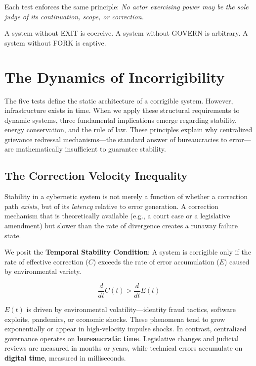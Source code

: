 \documentclass{article}
\begin{document}
Each test enforces the same principle: \textit{No actor exercising power may be the sole judge of its continuation, scope, or correction.}

A system without EXIT is coercive. A system without GOVERN is arbitrary. A system without FORK is captive.

\section{The Dynamics of Incorrigibility}

The five tests define the static architecture of a corrigible system. However, infrastructure exists in time. When we apply these structural requirements to dynamic systems, three fundamental implications emerge regarding stability, energy conservation, and the rule of law. These principles explain why centralized grievance redressal mechanisms---the standard answer of bureaucracies to error---are mathematically insufficient to guarantee stability.

\subsection{The Correction Velocity Inequality}

Stability in a cybernetic system is not merely a function of whether a correction path \textit{exists}, but of its \textit{latency} relative to error generation. A correction mechanism that is theoretically available (e.g., a court case or a legislative amendment) but slower than the rate of divergence creates a runaway failure state.

We posit the \textbf{Temporal Stability Condition}: A system is corrigible only if the rate of effective correction ($C$) exceeds the rate of error accumulation ($E$) caused by environmental variety.

\begin{equation}
\frac{d}{dt} C(t) > \frac{d}{dt} E(t)
\end{equation}

$E(t)$ is driven by environmental volatility---identity fraud tactics, software exploits, pandemics, or economic shocks. These phenomena tend to grow exponentially or appear in high-velocity impulse shocks. In contrast, centralized governance operates on \textbf{bureaucratic time}. Legislative changes and judicial reviews are measured in months or years, while technical errors accumulate on \textbf{digital time}, measured in milliseconds.
\end{document}
